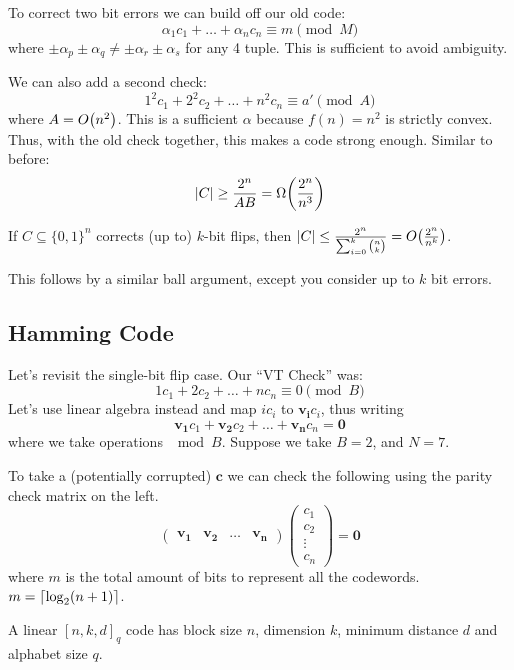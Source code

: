 To correct two bit errors we can build off our old code:
\[ \alpha_1 c_1 + \dots + \alpha_n c_n \equiv m \pmod M \]
where $\pm \alpha_p \pm \alpha_q \neq \pm \alpha_r \pm \alpha_s$ for any 4 tuple. This is sufficient to avoid ambiguity.

We can also add a second check:
\[ 1^2 c_1 + 2^2 c_2 + \dots + n^2 c_n \equiv a' \pmod A \]
where $A = O\qty(n^2)$. This is a sufficient $\alpha$ because $f(n) = n^2$ is strictly convex. Thus, with the old check together, this makes a code strong enough.
Similar to before:
\[ |C| \geq \frac{2^n}{AB} = \Omega\qty(\frac{2^n}{n^3}) \]

\begin{theorem}
    If $C \subseteq \{0, 1\}^n$ corrects (up to) $k$-bit flips, then $|C| \leq \frac{2^n}{\sum_{i = 0}^{k} \binom{n}{k}} = O\qty(\frac{2^n}{n^k})$.
\end{theorem}

This follows by a similar ball argument, except you consider up to $k$ bit errors.

\subsection{Hamming Code}
Let's revisit the single-bit flip case. Our ``VT Check'' was:
\[ 1c_1 + 2c_2 + \dots + n c_n \equiv 0 \pmod B \]
Let's use linear algebra instead and map $ic_i$ to $\mathbf{v_i} c_i$,
thus writing
\[ \mathbf{v_1} c_1 + \mathbf{v_2} c_2 + \dots + \mathbf{v_n} c_n = \mathbf{0} \]
where we take operations $\mod B$. Suppose we take $B = 2$, and $N = 7$. 

To take a (potentially corrupted) $\mathbf{c}$ we can check the following using the parity check matrix on the left.
\[ \begin{pmatrix}
    \mathbf{v_1} & \mathbf{v_2} & \dots & \mathbf{v_n}
\end{pmatrix} \begin{pmatrix}
    c_1 \\ c_2 \\ \vdots \\ c_n
\end{pmatrix} = \mathbf{0} \]
where $m$ is the total amount of bits to represent all the codewords. $m = \left\lceil \log_2 (n + 1) \right\rceil$.

\begin{definition} 
    A linear $[n, k, d]_q$ code has block size $n$, dimension $k$, minimum distance $d$ and alphabet size $q$.
\end{definition}

